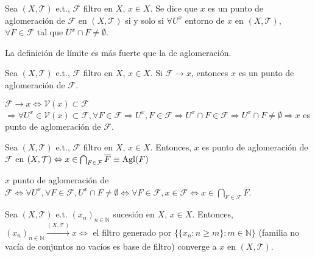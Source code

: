 \begin{defn}[Aglomeración]  
  Sea $( X, \mathcal{T} )$ e.t., $\mathcal{F}$ filtro en $X$, $x \in X$. Se dice que $x$ es un punto de aglomeración de $\mathcal{F}$ en $( X, \mathcal{T} )$ si y solo si $\forall U^{x}$ entorno de $x$ en $( X, \mathcal{T} )$, $\forall F \in \mathcal{F}$ tal que $U^{x} \cap F \neq \emptyset$.
\end{defn}

\begin{obs}
  La definición de límite es más fuerte que la de aglomeración.
\end{obs}

\begin{prop}
  Sea $( X, \mathcal{T} )$ e.t., $\mathcal{F}$ filtro en $X$, $x \in X$. Si $\mathcal{F} \rightarrow x$, entonces $x$ es un punto de aglomeración de $\mathcal{F}$.
\end{prop}

\begin{dem}
  $\mathcal{F} \rightarrow x \Leftrightarrow \mathcal{V}(x) \subset \mathcal{F}$ $\Rightarrow \forall U^x \in \mathcal{V}(x) \subset \mathcal{F}, \forall F \in \mathcal{F} \Rightarrow U^{x}, F \in \mathcal{F} \Rightarrow U^{x} \cap F \in \mathcal{F} \Rightarrow U^{x} \cap F \neq \emptyset \Rightarrow x$ es punto de aglomeración de $\mathcal{F}$.
\end{dem}

\begin{prop}
  Sea $( X, \mathcal{T} )$ e.t., $\mathcal{F}$ filtro en $X$, $x \in X$. Entonces, $x$ es punto de aglomeración de $\mathcal{F}$ en $( X, \mathcal{T} ) \Leftrightarrow x \in \bigcap_{F \in \mathcal{F}} \overline{F} \equiv \operatorname{Agl}(F)$
\end{prop}

\begin{dem}
  $x$ punto de aglomeración de $\mathcal{F} \Leftrightarrow \forall U^{x}, \forall F \in \mathcal{F}, U^{x} \cap F \neq \emptyset \Leftrightarrow \forall F \in \mathcal{F}, x \in \mathcal{F} \Leftrightarrow x \in \bigcap_{F \in \mathcal{F}} \overline{F}$.
\end{dem}

\begin{prop}
  Sea $( X, \mathcal{T} )$ e.t. $( x_{n} )_{n \in \mathbb{N}}$ sucesión en $X$, $x \in X$. Entonces, $( x_{n} )_{n \in \mathbb{N}} \xrightarrow[]{ ( X, \mathcal{T} ) } x \Leftrightarrow$ el filtro generado por $\{ \{ x_{n} : n \geq m \} : m \in \mathbb{N} \}$ (familia no vacía de conjuntos no vacíos es base de filtro) converge a $x$ en $( X, \mathcal{T} )$.
\end{prop}


